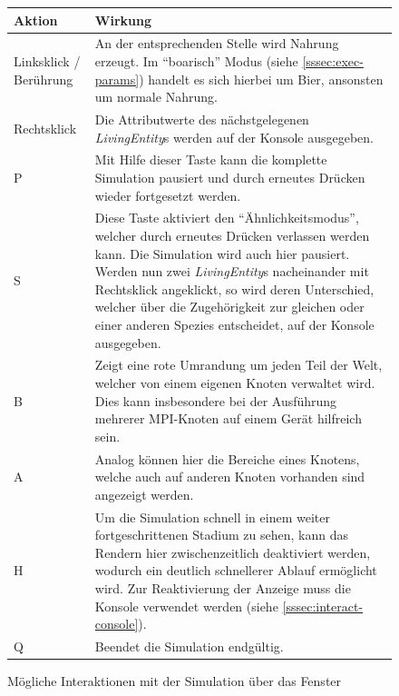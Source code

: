 \documentclass[course=erap]{aspdoc}
\begin{document}
\begin{figure}
\centering
\begin{longtable}{| p{2cm} | p{12cm} |}
\hline
Aktion & Wirkung \\
\hline
\hline
Linksklick / Berührung &
An der entsprechenden Stelle wird Nahrung erzeugt. Im "`boarisch"' Modus (siehe \ref{sssec:exec-params}) handelt es sich hierbei um Bier, ansonsten um normale Nahrung. \\
\hline
Rechtsklick &
Die Attributwerte des nächstgelegenen \emph{LivingEntity}s werden auf der Konsole ausgegeben. \\
\hline
P &
Mit Hilfe dieser Taste kann die komplette Simulation pausiert und durch erneutes Drücken wieder fortgesetzt werden.\\
\hline
S &
Diese Taste aktiviert den "`Ähnlichkeitsmodus"', welcher durch erneutes Drücken verlassen werden kann. Die Simulation wird auch hier pausiert. Werden nun zwei \emph{LivingEntity}s nacheinander mit Rechtsklick angeklickt, so wird deren Unterschied, welcher über die Zugehörigkeit zur gleichen oder einer anderen Spezies entscheidet, auf der Konsole ausgegeben.\\
\hline
B &
Zeigt eine rote Umrandung um jeden Teil der Welt, welcher von einem eigenen Knoten verwaltet wird. Dies kann insbesondere bei der Ausführung mehrerer MPI-Knoten auf einem Gerät hilfreich sein.\\
\hline
A &
Analog können hier die Bereiche eines Knotens, welche auch auf anderen Knoten vorhanden sind angezeigt werden.\\
\hline
H &
Um die Simulation schnell in einem weiter fortgeschrittenen Stadium zu sehen, kann das Rendern hier zwischenzeitlich deaktiviert werden, wodurch ein deutlich schnellerer Ablauf ermöglicht wird. Zur Reaktivierung der Anzeige muss die Konsole verwendet werden (siehe \ref{sssec:interact-console}).\\
\hline
Q &
Beendet die Simulation endgültig.\\
\hline
\end{longtable}
\caption{Mögliche Interaktionen mit der Simulation über das Fenster}
\label{table:interact-window}
\end{figure}
\end{document}
